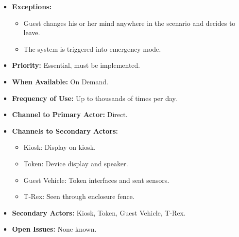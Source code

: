 \documentclass[12pt]{article}
\begin{document}
\begin{itemize}
        \item[]\textbf{Exceptions:}
            \begin{itemize}
                \item[] Guest changes his or her mind anywhere in the scenario and decides to leave.
                \item[] The system is triggered into emergency mode.
            \end{itemize}

        \item[]\textbf{Priority:}
            Essential, must be implemented.

        \item[]\textbf{When Available:}
            On Demand.

        \item[]\textbf{Frequency of Use:}
            Up to thousands of times per day.

        \item[]\textbf{Channel to Primary Actor:}
            Direct.

        \item[]\textbf{Channels to Secondary Actors:}
            \begin{itemize}
                \item[] Kiosk: Display on kiosk.
                \item[] Token: Device display and speaker.
                \item[] Guest Vehicle: Token interfaces and seat sensors.
                \item[] T-Rex: Seen through enclosure fence.
            \end{itemize}
        \item[]\textbf{Secondary Actors:}
            Kiosk, Token, Guest Vehicle, T-Rex.

        \item[]\textbf{Open Issues:}
            None known.
    \end{itemize}
\end{document}
